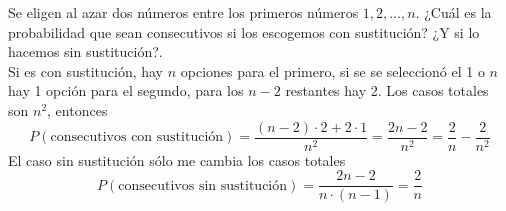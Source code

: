 \item Se eligen al azar dos números entre los primeros números $1,2,\dots,n$. ¿Cuál es la probabilidad que sean consecutivos si los escogemos con sustitución? ¿Y si lo hacemos sin sustitución?.\e\\
    Si es con sustitución, hay $n$ opciones para el primero, si se se seleccionó el 1 o $n$ hay 1 opción para el segundo, para los $n-2$ restantes hay 2. Los casos totales son $n^2$, entonces\[P(\text{consecutivos con sustitución})=\frac{(n-2)\cdot2+2\cdot1}{n^2}=\frac{2n-2}{n^2}=\frac{2}{n}-\frac{2}{n^2}\]
    El caso sin sustitución sólo me cambia los casos totales \[P(\text{consecutivos sin sustitución})=\frac{2n-2}{n\cdot(n-1)}=\frac{2}{n}\]